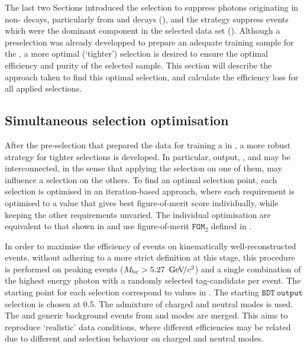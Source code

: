 The last two Sections introduced the selection to suppress photons originating in non-\mbox{\BtoXsgamma} decays, particularly from \piz and \eta decays (),
and the strategy suppress \mbox{\epem\ra\qqbar} events which were the dominant component in the selected data set ().
Although a preselection was already developped to prepare an adequate training sample for the \BDT, a more optimal (`tighter') selection is desired to ensure the optimal efficiency and purity of the selected sample.
This section will describe the approach taken to find this optimal selection, and calculate the efficiency loss for all applied selections.

\subsection{Simultaneous selection optimisation}\label{sec:simultaneous_optimisation}

After the pre-selection that prepared the data for training a \BDT in , a more robust strategy for tighter selections is developed.
In particular, \BDT output, \piVeto, \etaVeto and \ZMVA may be interconnected, in the sense that applying the selection on one of them, may influence a selection on the others. 
To find an optimal selection point, each selection is optimised in an iteration-based approach, 
where each requirement is optimised to a value that gives best figure-of-merit score individually,
while keeping the other requirements unvaried.
The individual optimisation are equivalent to that shown in  and use figure-of-merit $\mathtt{FOM}_2$ defined in .


In order to maximise the efficiency of events on kinematically well-reconstructed events, without adhering to a more strict definition at this stage, 
this procedure is performed on peaking events (${M_{\mathrm{bc}}} >5.27~{\mathrm{\,Ge\kern -0.1em V\!/}c^2}$) and a single combination of the highest energy photon with a randomly selected tag-candidate per event.
The starting point for each selection correspond to values in .
The starting $\mathtt{BDT~output}$ selection is chosen at 0.5. 
The \BtoXsgamma admixture of charged and neutral modes is used.
The \epem\ra\qqbar and generic \BB background events from \feiBp and \feiBz modes are merged.
This aims to reproduce `realistic' data conditions, where different efficiencies may be related due to different \FEI and selection behaviour on charged and neutral modes.

